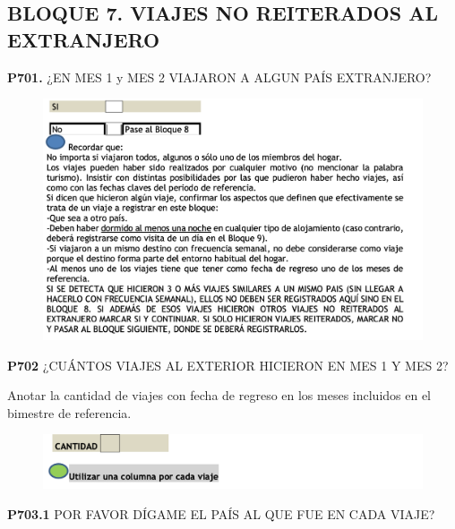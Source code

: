 \documentclass[
  openany]{book}
\begin{document}
\hypertarget{bloque-7.-viajes-no-reiterados-al-extranjero}{%
\subsection{\texorpdfstring{\textbf{BLOQUE 7. VIAJES NO REITERADOS AL EXTRANJERO}}{BLOQUE 7. VIAJES NO REITERADOS AL EXTRANJERO}}\label{bloque-7.-viajes-no-reiterados-al-extranjero}}

\textbf{P701.} ¿EN MES 1 y MES 2 VIAJARON A ALGUN PAÍS EXTRANJERO?

\begin{figure}

{\centering \includegraphics[width=1\linewidth]{imagenes/figura6-235} 

}

\end{figure}

\textbf{P702} ¿CUÁNTOS VIAJES AL EXTERIOR HICIERON EN MES 1 Y MES 2?

Anotar la cantidad de viajes con fecha de regreso en los meses incluidos en el bimestre de referencia.

\begin{figure}

{\centering \includegraphics[width=1\linewidth]{imagenes/figura6-236} 

}

\end{figure}

\textbf{P703.1} POR FAVOR DÍGAME EL PAÍS AL QUE FUE EN CADA VIAJE?
\end{document}
